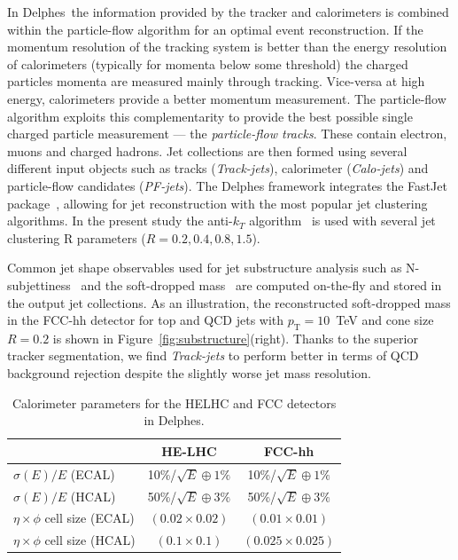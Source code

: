 \documentclass[a4paper,11pt]{article}
\newcommand{\pt}{\ensuremath{p_{\text{T}}}}
\newcommand{\delphes}{{\sc Delphes}}
\begin{document}
In \delphes{}~the information provided by the tracker and calorimeters is combined within the particle-flow algorithm for an optimal event reconstruction. If the momentum resolution of the tracking system is better than the energy resolution of calorimeters (typically for momenta below some threshold) the charged particles momenta are measured mainly through tracking. Vice-versa at high energy, calorimeters provide a better momentum measurement. The particle-flow algorithm exploits this complementarity to provide the best possible single charged particle measurement --- the \emph{particle-flow tracks}. These contain electron, muons and charged hadrons. Jet collections are then formed using several different input objects such as tracks (\emph{Track-jets}), calorimeter (\emph{Calo-jets}) and particle-flow candidates (\emph{PF-jets}). The Delphes framework integrates the FastJet package~\cite{Cacciari:2011ma}, allowing for jet reconstruction with the most popular jet clustering algorithms. In the present study the anti-$k_T$ algorithm~\cite{Cacciari:2008gp} is used with several jet clustering R parameters ($R=0.2, 0.4, 0.8, 1.5$).

Common jet shape observables used for jet substructure analysis such as N-subjettiness~\cite{Thaler:2010tr} and the soft-dropped mass~\cite{Larkoski:2014wba} are computed on-the-fly and stored in the output jet collections. As an illustration, the reconstructed soft-dropped mass in the FCC-hh detector for top and QCD jets with $\pt=10$~TeV and cone size $R=0.2$ is shown in Figure~\ref{fig:substructure}(right). Thanks to the superior tracker segmentation, we find \emph{Track-jets} to perform better in terms of QCD background rejection despite the slightly worse jet mass resolution.

\begin {table}[htb!]
\begin{center}
\begin{tabular}{l||c|c}
& HE-LHC & FCC-hh \\
  \hline
  \hline
$\sigma(E)/E $ (ECAL)& 10\%/$\sqrt{E} \oplus 1\%$ &  10\%/$\sqrt{E} \oplus 1\%$\\
   \hline
$\sigma(E)/E $ (HCAL)& 50\%/$\sqrt{E} \oplus 3\%$  &  50\%/$\sqrt{E} \oplus 3\%$\\
  \hline
  \hline
$\eta \times \phi$ cell size (ECAL)& $(0.02\times0.02)$ &  $(0.01\times0.01)$\\
  \hline
 $\eta \times \phi$ cell size  (HCAL)& $(0.1\times0.1)$ & $(0.025\times0.025)$
\end{tabular}
\caption{Calorimeter parameters for the HELHC and FCC detectors in Delphes.}
\label{tab:cal_param}
\end{center}
\end{table}
\end{document}
